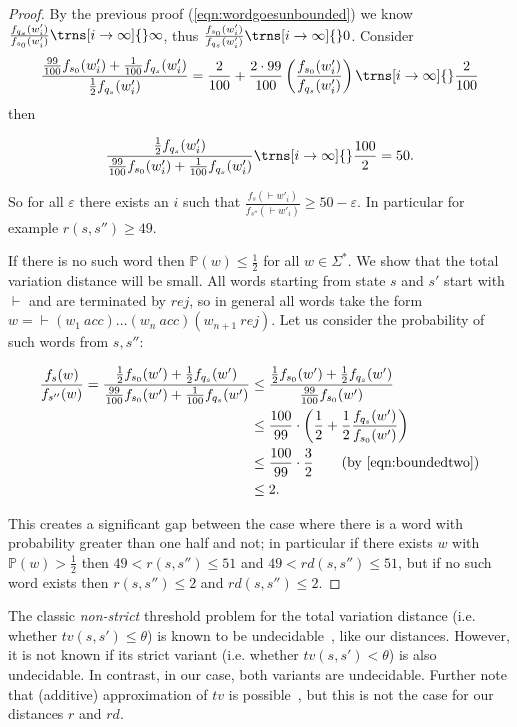 \documentclass{lmcs}
\theoremstyle{plain}
\theoremstyle{definition}
\theoremstyle{remark}
\newcommand\acc{\mathit{acc}}
\newcommand\rej{\mathit{rej}}
\newcommand\pbra[1]{\left( #1 \right)}
\newcommand\pr{\mathbb{P}}
\newcommand\tvra{\mathit{r}}
\newcommand\tvrs{\mathit{rd}}
\newcommand\tvstandard{\mathit{tv}}
\renewcommand\nu{f}
\begin{document}
\begin{proof}
By the previous proof (\cref{eqn:wordgoesunbounded}) we know $\frac{\nu_{q_s}(w'_i)}{\nu_{s_0}(w'_i)} \trns[i \to \infty]{} \infty$, thus $\frac{\nu_{s_0}(w'_i)}{\nu_{q_s}(w'_i)} \trns[i \to \infty]{} 0$.
Consider
\[\frac{\frac{99}{100}\nu_{s_0}(w'_i)+ \frac{1}{100}\nu_{q_s}(w'_i)}{\frac{1}{2}\nu_{q_s}(w'_i)} = \frac{2}{100} + \frac{2\cdot 99}{100}\pbra{\frac{\nu_{s_0}(w'_i)}{\nu_{q_s}(w'_i)}}
\trns[i \to \infty]{} \frac{2}{100}
\]
then

\[\frac{\frac{1}{2}\nu_{q_s}(w'_i)}{\frac{99}{100}\nu_{s_0}(w'_i)+ \frac{1}{100}\nu_{q_s}(w'_i)} \trns[i \to \infty]{} \frac{100}{2} = 50.\]

So for all $\varepsilon$ there exists an $i$ such that $\frac{\nu_s({\vdash}w'_i)}{\nu_{s''}({\vdash}w'_i)} \ge 50- \varepsilon$. In particular for example $\tvra(s,s'') \ge 49$.

If there is no such word then  $\pr(w) \le \frac{1}{2}$ for all $w\in\Sigma^*$. We show that the total variation distance will be small. All words starting from state $s$ and $s'$ start with ${\vdash}$ and are terminated by $\rej$, so in general all words take the form $w = {\vdash}(w_1\ \acc)\dots (w_n\ \acc)(w_{n+1}\ \rej)$. Let us consider the probability of such words from $s,s''$:

\begin{align*}
\frac{\nu_s(w)}{\nu_{s''}(w)}
= \frac{\frac{1}{2}\nu_{s_0}(w') + \frac{1}{2}\nu_{q_s}(w')}{\frac{99}{100}\nu_{s_0}(w')+ \frac{1}{100}\nu_{q_s}(w')}
& \le  \frac{\frac{1}{2}\nu_{s_0}(w') + \frac{1}{2}\nu_{q_s}(w')}{\frac{99}{100}\nu_{s_0}(w')}
\\& \le \frac{100}{99}\cdot \pbra{\frac{1}{2} + \frac{1}{2} \frac{\nu_{q_s}(w')}{\nu_{s_0}(w')}}
\\&\le \frac{100}{99}\cdot \frac{3}{2}   \tag{by \cref{eqn:boundedtwo}}
\\ &\le 2.
\end{align*}

This creates a significant gap between the case where there is a word with probability greater than one half and not; in particular if there exists $ w$ with $\pr(w) > \frac{1}{2}$ then $49 < \tvra(s,s'') \le 51$ and $ 49 < \tvrs(s,s'') \le 51$, but if no such word exists then $\tvra(s,s'') \le 2$ and $\tvrs(s,s'') \le 2$.
\end{proof}

\begin{rem}
The classic \emph{non-strict} threshold problem for the  total variation distance (i.e. whether $\tvstandard(s,s') \le \theta$) is  known to be undecidable~\cite{kiefer2018computing}, like our distances.
However,   it is not known if its strict variant  (i.e. whether $\tvstandard(s,s') < \theta$) is also undecidable. In contrast, in our case, both variants are undecidable. Further note that (additive) approximation of $\tvstandard$ is possible~\cite{kiefer2018computing,chen2014total}, but this is not the case for our distances $\tvra$ and $\tvrs$.
\end{rem}
\end{document}
